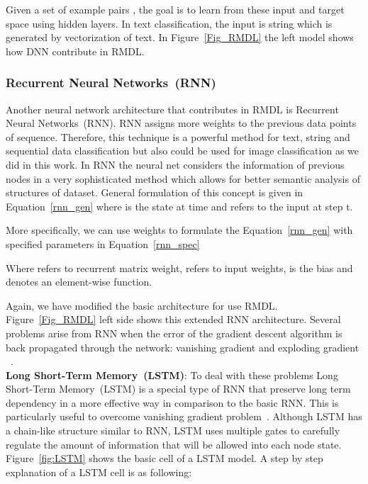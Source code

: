 \documentclass[sigconf, final]{acmart}
\begin{document}
 Given a set of example pairs , the goal is to learn from these input and target space using hidden layers. In text classification, the input is string which is generated by vectorization of text. In Figure~\ref{Fig_RMDL} the left model shows how DNN contribute in RMDL.


\subsubsection{Recurrent Neural Networks~(RNN)}\label{subsubsec:RNN}
Another neural network architecture that contributes in RMDL is Recurrent Neural Networks~(RNN). RNN assigns more weights to the previous data points of sequence. Therefore, this technique is a powerful method for text, string and sequential data classification but also  could be used for image classification as we did in this work. In RNN the neural net considers the information of previous nodes in a very sophisticated method which allows for better semantic analysis of structures of dataset. General formulation of this concept is given in Equation~\ref{rnn_gen} where  is the state at time  and  refers to the input at step t.



More specifically, we can use weights to formulate the Equation~\ref{rnn_gen} with  specified parameters in Equation~\ref{rnn_spec}



Where  refers to recurrent matrix weight,  refers to input weights,  is the bias and  denotes an element-wise function. 

Again, we have modified the basic architecture for use RMDL. Figure~\ref{Fig_RMDL} left side shows this extended RNN architecture. Several problems arise from RNN when the error of the gradient descent algorithm is back propagated through the network: vanishing gradient and exploding gradient ~\cite{bengio1994learning}. \\
\textbf{Long Short-Term Memory~(LSTM)}: To deal with these problems Long Short-Term Memory~(LSTM) is a special type of RNN that preserve long term dependency in a more effective way in comparison to the basic RNN. This is particularly useful to overcome vanishing gradient problem~\cite{pascanu2013difficulty}. Although LSTM has a chain-like structure similar to RNN,
LSTM uses multiple gates to carefully regulate the amount of information that will be allowed into each node state. Figure~\ref{fig:LSTM} shows the basic cell of a LSTM model. A step by step explanation of a LSTM cell is as following:
\end{document}
